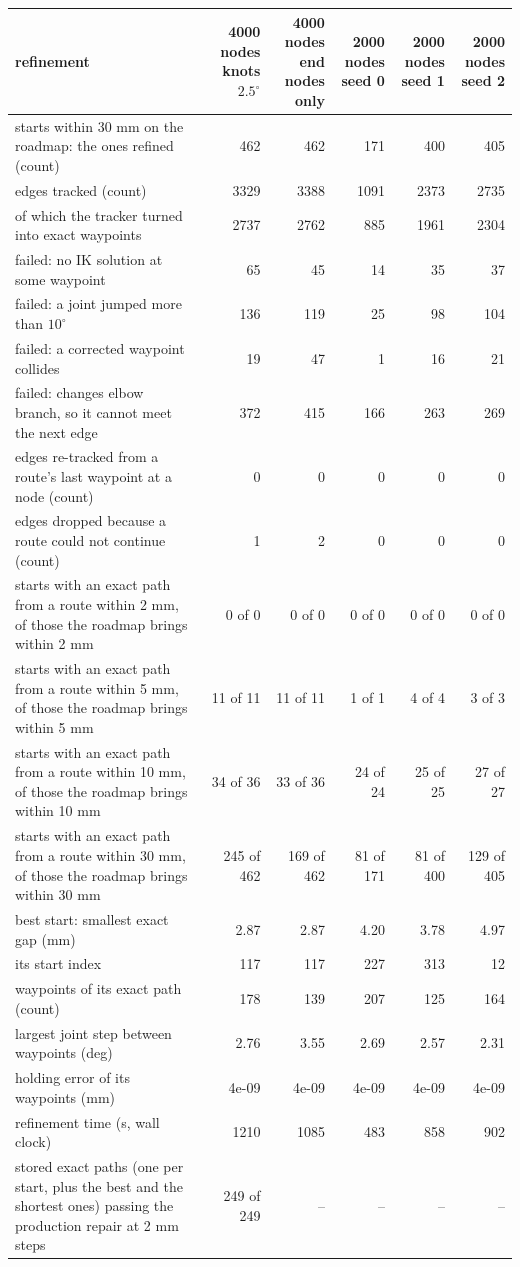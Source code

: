 \begin{tabular}{@{}>{\raggedright\arraybackslash}p{7.6cm} rrrrr@{}}
\toprule
refinement & \shortstack{4000 nodes\\knots $2.5^\circ$} & \shortstack{4000 nodes\\end nodes only} & \shortstack{2000 nodes\\seed 0} & \shortstack{2000 nodes\\seed 1} & \shortstack{2000 nodes\\seed 2} \\
\midrule
starts within 30 mm on the roadmap: the ones refined (count) & 462 & 462 & 171 & 400 & 405 \\
edges tracked (count) & 3329 & 3388 & 1091 & 2373 & 2735 \\
\quad of which the tracker turned into exact waypoints & 2737 & 2762 & 885 & 1961 & 2304 \\
\quad failed: no IK solution at some waypoint & 65 & 45 & 14 & 35 & 37 \\
\quad failed: a joint jumped more than $10^\circ$ & 136 & 119 & 25 & 98 & 104 \\
\quad failed: a corrected waypoint collides & 19 & 47 & 1 & 16 & 21 \\
\quad failed: changes elbow branch, so it cannot meet the next edge & 372 & 415 & 166 & 263 & 269 \\
edges re-tracked from a route's last waypoint at a node (count) & 0 & 0 & 0 & 0 & 0 \\
edges dropped because a route could not continue (count) & 1 & 2 & 0 & 0 & 0 \\
\midrule
starts with an exact path from a route within 2 mm, of those the roadmap brings within 2 mm & 0 of 0 & 0 of 0 & 0 of 0 & 0 of 0 & 0 of 0 \\
starts with an exact path from a route within 5 mm, of those the roadmap brings within 5 mm & 11 of 11 & 11 of 11 & 1 of 1 & 4 of 4 & 3 of 3 \\
starts with an exact path from a route within 10 mm, of those the roadmap brings within 10 mm & 34 of 36 & 33 of 36 & 24 of 24 & 25 of 25 & 27 of 27 \\
starts with an exact path from a route within 30 mm, of those the roadmap brings within 30 mm & 245 of 462 & 169 of 462 & 81 of 171 & 81 of 400 & 129 of 405 \\
\midrule
best start: smallest exact gap (mm) & 2.87 & 2.87 & 4.20 & 3.78 & 4.97 \\
\quad its start index & 117 & 117 & 227 & 313 & 12 \\
\quad waypoints of its exact path (count) & 178 & 139 & 207 & 125 & 164 \\
\quad largest joint step between waypoints (deg) & 2.76 & 3.55 & 2.69 & 2.57 & 2.31 \\
\quad holding error of its waypoints (mm) & 4e-09 & 4e-09 & 4e-09 & 4e-09 & 4e-09 \\
refinement time (s, wall clock) & 1210 & 1085 & 483 & 858 & 902 \\
stored exact paths (one per start, plus the best and the shortest ones) passing the production repair at 2 mm steps & 249 of 249 & -- & -- & -- & -- \\
\bottomrule
\end{tabular}

